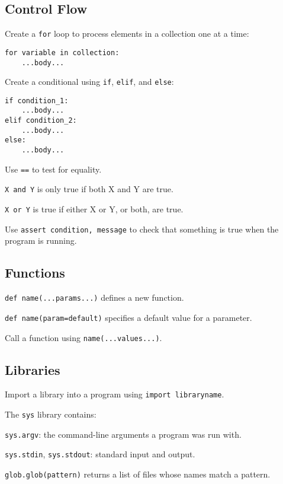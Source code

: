 \subsection*{Control Flow}

\begin{swcitemize}
\item
  Create a \texttt{for} loop to process elements in a collection one at
  a time:

\begin{Verbatim}
for variable in collection:
    ...body...
\end{Verbatim}
\item
  Create a conditional using \texttt{if}, \texttt{elif}, and
  \texttt{else}:

\begin{Verbatim}
if condition_1:
    ...body...
elif condition_2:
    ...body...
else:
    ...body...
\end{Verbatim}
\item
  Use \texttt{==} to test for equality.
\item
  \texttt{X and Y} is only true if both X and Y are true.
\item
  \texttt{X or Y} is true if either X or Y, or both, are true.
\item
  Use \texttt{assert condition, message} to check that something is true
  when the program is running.
\end{swcitemize}

\subsection*{Functions}

\begin{swcitemize}
\item
  \texttt{def name(...params...)} defines a new function.
\item
  \texttt{def name(param=default)} specifies a default value for a
  parameter.
\item
  Call a function using \texttt{name(...values...)}.
\end{swcitemize}

\subsection*{Libraries}

\begin{swcitemize}
\item
  Import a library into a program using \texttt{import libraryname}.
\item
  The \texttt{sys} library contains:

  \begin{swcitemize2}
  \item
    \texttt{sys.argv}: the command-line arguments a program was run
    with.
  \item
    \texttt{sys.stdin}, \texttt{sys.stdout}: standard input and output.
   \end{swcitemize2}
\item
  \texttt{glob.glob(pattern)} returns a list of files whose names match
  a pattern.
\end{swcitemize}

